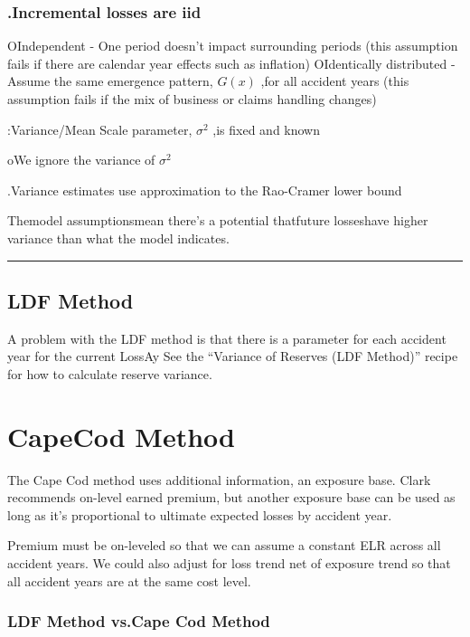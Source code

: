 \documentclass[
]{article}
\begin{document}
\subsubsection{.Incremental losses are
iid}\label{incremental-losses-are-iid}

OIndependent - One period doesn't impact surrounding periods (this
assumption fails if there are calendar year effects such as inflation)
OIdentically distributed - Assume the same emergence pattern, \(G(x)\)
,for all accident years (this assumption fails if the mix of business or
claims handling changes)

:Variance/Mean Scale parameter, \(\sigma^2\) ,is fixed and known

oWe ignore the variance of \(\sigma^{2}\)

.Variance estimates use approximation to the Rao-Cramer lower bound

Themodel assumptionsmean there's a potential thatfuture losseshave
higher variance than what the model indicates.

\begin{center}\rule{0.5\linewidth}{0.5pt}\end{center}

\subsection{LDF Method}\label{ldf-method}

A problem with the LDF method is that there is a parameter for each
accident year for the current LossAy See the ``Variance of Reserves (LDF
Method)'' recipe for how to calculate reserve variance.

\section{CapeCod Method}\label{capecod-method}

The Cape Cod method uses additional information, an exposure base. Clark
recommends on-level earned premium, but another exposure base can be
used as long as it's proportional to ultimate expected losses by
accident year.

Premium must be on-leveled so that we can assume a constant ELR across
all accident years. We could also adjust for loss trend net of exposure
trend so that all accident years are at the same cost level.

\subsubsection{LDF Method vs.Cape Cod
Method}\label{ldf-method-vs.cape-cod-method}
\end{document}
